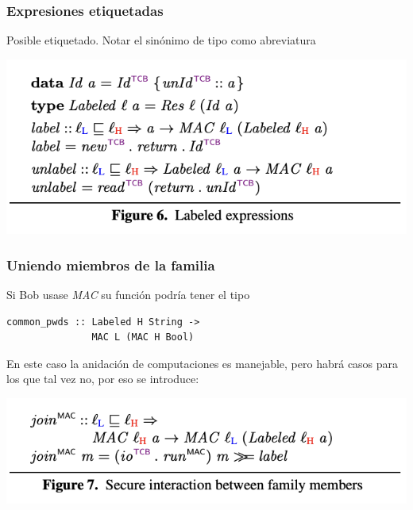 \documentclass{beamer}
\begin{document}
\begin{frame}
    \frametitle{Expresiones etiquetadas}

    Posible etiquetado. Notar el sinónimo de tipo como abreviatura  

    \begin{center}
        \includegraphics[scale=0.8]{figure6.png}
    \end{center}
\end{frame}

\begin{frame}[fragile]
    \frametitle{Uniendo miembros de la familia}
    Si Bob usase \textit{MAC} su función podría tener el tipo

    \begin{lstlisting}
common_pwds :: Labeled H String -> 
               MAC L (MAC H Bool)
    \end{lstlisting}
    
    En este caso la anidación de computaciones es manejable, pero habrá casos para los que tal vez no, por eso se introduce:

    \begin{center}
        \includegraphics[scale=0.8]{figure7.png}
    \end{center}
\end{frame}
\end{document}
